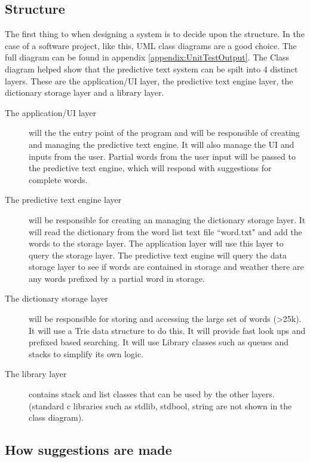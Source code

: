 \documentclass[10pt]{article} %
\begin{document}
        \subsection{Structure}
            The first thing to when designing a system is to decide upon the structure. In the case of a software project, like this, UML class diagrams are a good choice. The full diagram can be found in appendix \ref{appendix:UnitTestOutput}. The Class diagram helped show that the predictive text system can be spilt into 4 distinct layers. These are the application/UI layer, the predictive text engine layer, the dictionary storage layer and a library layer.
            \begin{description}
            \item[The application/UI layer] will the the entry point of the program and will be responsible of creating and managing the predictive text engine. It will also manage the UI and inputs from the user.
            Partial words from the user input will be passed to the predictive text engine, which will respond with suggestions for complete words.
            
            \item[The predictive text engine layer] will be responsible for creating an managing the dictionary storage layer. It will read the dictionary from the word list text file ``word.txt" and add the words to the storage layer. The application layer will use this layer to query the storage layer. The predictive text engine will query the data storage layer to see if words are contained in storage and weather there are any words prefixed by a partial word in storage.
            
            \item[The dictionary storage layer] will be responsible for storing and accessing the large set of words (\textgreater 25k). It will use a Trie data structure to do this. It will provide fast look ups and prefixed based searching. It will use Library classes such as queues and stacks to simplify its own logic.
            
            \item[The library layer] contains stack and list classes that can be used by the other layers. (standard c libraries such as stdlib, stdbool, string are not shown in the class diagram).
            \end{description}
        \subsection{How suggestions are made}
        
\end{document}

